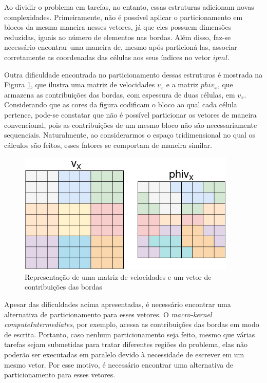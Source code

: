 \documentclass[cic,tc]{iiufrgs}
\begin{document}
Ao dividir o problema em tarefas, no entanto, essas estruturas adicionam novas complexidades. Primeiramente, não é possível aplicar
o particionamento em blocos da mesma maneira nesses vetores, já que eles possuem dimensões reduzidas, iguais ao número de elementos
nas bordas. Além disso, faz-se necessário encontrar uma maneira de, mesmo após particioná-las, associar corretamente as coordenadas das células
aos seus índices no vetor $ipml$.

Outra dificuldade encontrada no particionamento dessas estruturas é mostrada na Figura \ref{fig:ipml}, que ilustra uma matriz de velocidades $v_x$
e a matriz $phiv_x$, que armazena as contribuições das bordas, com espessura de duas células, em $v_x$. Considerando que as cores da figura codificam o bloco ao qual cada célula
pertence, pode-se constatar que não é possível particionar os vetores de maneira convencional, pois as contribuições de um
mesmo bloco não são necessariamente sequenciais. Naturalmente, ao considerarmos o espaço tridimensional no qual os cálculos são feitos,
esses fatores se comportam de maneira similar.

\begin{figure}[!htb]
    \caption{Representação de uma matriz de velocidades e um vetor de contribuições das bordas}
    \begin{center}
      \includegraphics[width=28em]{ipml}
    \end{center}
    \label{fig:ipml}
\end{figure}

Apesar das dificuldades acima apresentadas, é necessário encontrar uma alternativa de particionamento para esses vetores. O \textit{macro-kernel
  computeIntermediates}, por exemplo, acessa as contribuições das bordas em modo de escrita. Portanto, caso
nenhum particionamento seja feito, mesmo que várias tarefas sejam submetidas para tratar diferentes regiões do problema, elas
não poderão ser executadas em paralelo devido à necessidade de escrever em um mesmo vetor. Por esse motivo, é necessário encontrar
uma alternativa de particionamento para esses vetores.
\end{document}
